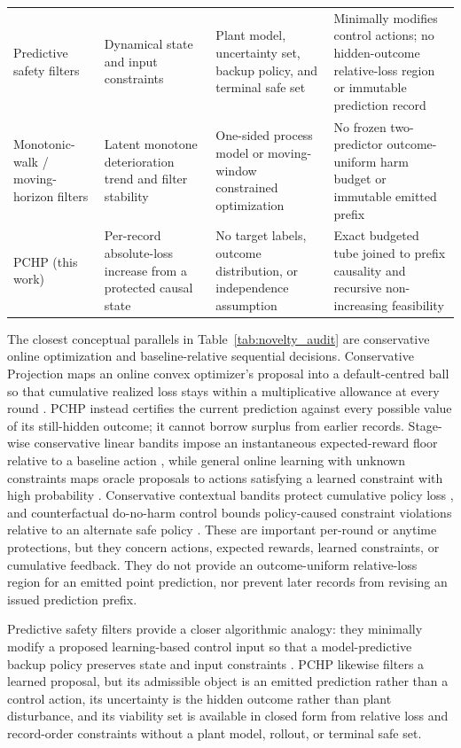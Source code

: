 \documentclass[11pt]{article}
\begin{document}
\begin{table}[p]
\begin{tabularx}{\textwidth}{@{}>{\raggedright\arraybackslash}p{}>{\raggedright\arraybackslash}p{}>{\raggedright\arraybackslash}p{}>{\raggedright\arraybackslash}X@{}}
    Predictive safety filters \citep{wabersich2021predictive} & Dynamical state and input constraints & Plant model, uncertainty set, backup policy, and terminal safe set & Minimally modifies control actions; no hidden-outcome relative-loss region or immutable prediction record \\
    Monotonic-walk / moving-horizon filters \citep{samar2004moving,gorinevsky2008efficient} & Latent monotone deterioration trend and filter stability & One-sided process model or moving-window constrained optimization & No frozen two-predictor outcome-uniform harm budget or immutable emitted prefix \\
    PCHP (this work) & Per-record absolute-loss increase from a protected causal state & No target labels, outcome distribution, or independence assumption & Exact budgeted tube joined to prefix causality and recursive non-increasing feasibility \\
    \bottomrule
  \end{tabularx}
\end{table}

The closest conceptual parallels in Table~\ref{tab:novelty_audit} are conservative online optimization and baseline-relative sequential decisions. Conservative Projection maps an online convex optimizer's proposal into a default-centred ball so that cumulative realized loss stays within a multiplicative allowance at every round \citep{bernasconi2021conservative}. PCHP instead certifies the current prediction against every possible value of its still-hidden outcome; it cannot borrow surplus from earlier records. Stage-wise conservative linear bandits impose an instantaneous expected-reward floor relative to a baseline action \citep{moradipari2020stagewise}, while general online learning with unknown constraints maps oracle proposals to actions satisfying a learned constraint with high probability \citep{sridharan2025unknown}. Conservative contextual bandits protect cumulative policy loss \citep{deb2025conservative}, and counterfactual do-no-harm control bounds policy-caused constraint violations relative to an alternate safe policy \citep{vaskov2024donoharm}. These are important per-round or anytime protections, but they concern actions, expected rewards, learned constraints, or cumulative feedback. They do not provide an outcome-uniform relative-loss region for an emitted point prediction, nor prevent later records from revising an issued prediction prefix.

Predictive safety filters provide a closer algorithmic analogy: they minimally modify a proposed learning-based control input so that a model-predictive backup policy preserves state and input constraints \citep{wabersich2021predictive}. PCHP likewise filters a learned proposal, but its admissible object is an emitted prediction rather than a control action, its uncertainty is the hidden outcome rather than plant disturbance, and its viability set is available in closed form from relative loss and record-order constraints without a plant model, rollout, or terminal safe set.
\end{document}
